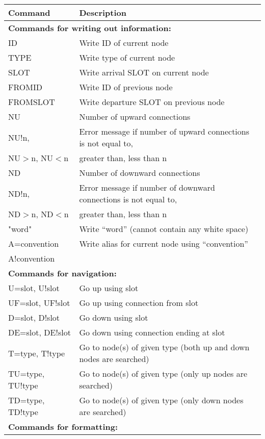 \begin{table}[tbp]
\begin{center}
\begin{tabular}{|l|l|}
\hline
Command & Description \\ \hline
\hline
\multicolumn{2}{|l|}{\bf Commands for writing out information:} \\ \hline
ID & 	Write ID of current node \\ \hline
TYPE & 	Write type of current node \\ \hline
SLOT & 	Write arrival SLOT on current node\\ \hline
FROMID & 	Write ID of previous node \\ \hline
FROMSLOT & 	Write departure SLOT on previous node\\ \hline
NU & Number of upward connections \\ \hline
NU!n, & Error message if number of upward connections is not equal to, \\
NU$>$n, NU$<$n & greater than, less than n \\ \hline
ND & Number of downward connections \\ \hline
ND!n, & Error message if number of downward connections is not equal to, \\
ND$>$n, ND$<$n &  greater than, less than n \\ \hline
"word" & 	Write ``word'' (cannot contain any white space) \\ \hline
A=convention  &  Write alias for current node using ``convention'' \\
A!convention  &  \\ \hline
\multicolumn{2}{|l|}{\bf Commands for navigation:} \\ \hline
U=slot, U!slot  & Go up using slot \\ \hline
UF=slot, UF!slot & Go up using connection from slot \\ \hline
D=slot, D!slot  & Go down using slot \\ \hline
DE=slot, DE!slot & Go down using connection ending at slot \\ \hline
T=type, T!type & Go to node(s) of given type (both up and down nodes are searched) \\ \hline
TU=type, TU!type & Go to node(s) of given type (only up nodes are searched) \\ \hline
TD=type, TD!type & Go to node(s) of given type (only down nodes are searched) \\ \hline
\multicolumn{2}{|l|}{\bf Commands for formatting:} \\ \hline

\end{tabular}
\end{center}
\end{table}
